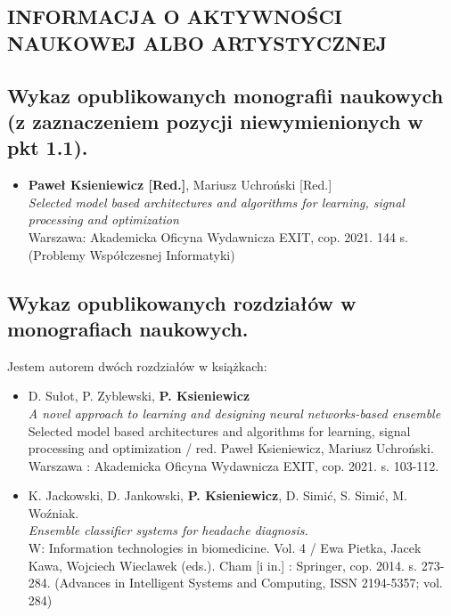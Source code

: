 

\begin{fullwidth}
	

\section{INFORMACJA O AKTYWNOŚCI NAUKOWEJ ALBO ARTYSTYCZNEJ}

\subsection{Wykaz opublikowanych monografii naukowych (z zaznaczeniem pozycji niewymienionych w pkt 1.1).}

\begin{itemize}
	\item \textbf{Paweł Ksieniewicz [Red.]}, Mariusz Uchroński [Red.]\\\emph{Selected model based architectures and algorithms for learning, signal processing and optimization}\\Warszawa: Akademicka Oficyna Wydawnicza EXIT, cop. 2021. 144 s. (Problemy Współczesnej Informatyki)
\end{itemize}

\subsection{Wykaz opublikowanych rozdziałów w monografiach naukowych.}

Jestem autorem dwóch rozdziałów w książkach:

\begin{itemize}
	\item D. Sułot, P. Zyblewski, \textbf{P. Ksieniewicz}\\\emph{A novel approach to learning and designing neural networks-based ensemble}\\Selected model based architectures and algorithms for learning, signal processing and optimization / red. Paweł Ksieniewicz, Mariusz Uchroński. Warszawa : Akademicka Oficyna Wydawnicza EXIT, cop. 2021. s. 103-112.
	\item K. Jackowski, D. Jankowski, \textbf{P. Ksieniewicz}, D. Simić, S. Simić, M. Woźniak.\\\emph{Ensemble classifier systems for headache diagnosis.}\\W: Information technologies in biomedicine. Vol. 4 / Ewa Pietka, Jacek Kawa, Wojciech Wieclawek (eds.). Cham [i in.] : Springer, cop. 2014. s. 273-284. (Advances in Intelligent Systems and Computing, ISSN 2194-5357; vol. 284)
\end{itemize}
			

\end{fullwidth}
